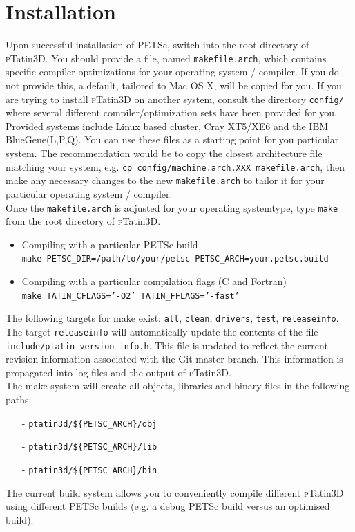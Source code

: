 \documentclass[paper=a4, fontsize=11pt,twoside]{scrartcl}
\newcommand{\ptat}{{{\textsc pTatin3D}}}
\newcommand{\shellcmd}[1]{\\\indent\indent\texttt{\hspace{5mm}\footnotesize #1}\\}
\newcommand{\unix}[1]{\texttt{\footnotesize #1}}
\begin{document}
\section{Installation}
Upon successful installation of PETSc, switch into the root directory of {\ptat}.
You should provide a file, named \unix{makefile.arch}, which contains specific compiler optimizations for your operating system / compiler.
If you do not provide this, a default, tailored to Mac OS X, will be copied for you.
If you are trying to install {\ptat} on another system,
consult the directory
\unix{config/}
where several different compiler/optimization sets have been provided for you. Provided systems include Linux based cluster, Cray XT5/XE6 and the  IBM BlueGene(L,P,Q). You can use these files as a starting point for you particular system. The recommendation would be to copy the closest architecture file matching your system, e.g. \unix{cp config/machine.arch.XXX  makefile.arch}, then make any necessary changes to the new \unix{makefile.arch} to tailor it for your particular operating system / compiler.
\\[8pt]
%
Once the \unix{makefile.arch} is adjusted for your operating systemtype, type \unix{make} from the root directory of \ptat{}.
\begin{itemize}
	\item Compiling with a particular PETSc build
	\shellcmd{make PETSC\_DIR=/path/to/your/petsc PETSC\_ARCH=your.petsc.build}
	\item Compiling with a particular compilation flags (C and Fortran)
	\shellcmd{make TATIN\_CFLAGS='-O2' TATIN\_FFLAGS='-fast'}
\end{itemize}
%
The following targets for make exist: \unix{all}, \unix{clean}, \unix{drivers}, \unix{test}, \unix{releaseinfo}.
The target \unix{releaseinfo} will automatically update the contents of the file \unix{include/ptatin\_version\_info.h}.
This file is updated to reflect the current revision information associated with the Git master branch. This information is
propagated into log files and the output of {\ptat}.
\\[8pt]
%
The make system will create all objects, libraries and binary files in the following paths:
\begin{enumerate}
\setlength\itemsep{0mm}
	\item[-] \unix{ptatin3d/\$\{PETSC\_ARCH\}/obj}
	\item[-] \unix{ptatin3d/\$\{PETSC\_ARCH\}/lib}
	\item[-] \unix{ptatin3d/\$\{PETSC\_ARCH\}/bin}
\end{enumerate}
The current build system allows you to conveniently compile different {\ptat} using different PETSc builds (e.g. a debug PETSc build versus an optimised build).
\end{document}

